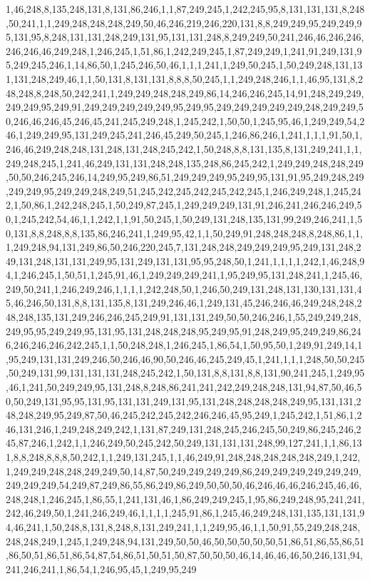 1,46,248,8,135,248,131,8,131,86,246,1,1,87,249,245,1,242,245,95,8,131,131,131,8,248,50,241,1,1,249,248,248,248,249,50,46,246,219,246,220,131,8,8,249,249,95,249,249,95,131,95,8,248,131,131,248,249,131,95,131,131,248,8,249,249,50,241,246,46,246,246,246,246,46,249,248,1,246,245,1,51,86,1,242,249,245,1,87,249,249,1,241,91,249,131,95,249,245,246,1,14,86,50,1,245,246,50,46,1,1,1,241,1,249,50,245,1,50,249,248,131,131,131,248,249,46,1,1,50,131,8,131,131,8,8,8,50,245,1,1,249,248,246,1,1,46,95,131,8,248,248,8,248,50,242,241,1,249,249,248,248,249,86,14,246,246,245,14,91,248,249,249,249,249,95,249,91,249,249,249,249,249,95,249,95,249,249,249,249,249,248,249,249,50,246,46,246,45,246,45,241,245,249,248,1,245,242,1,50,50,1,245,95,46,1,249,249,54,246,1,249,249,95,131,249,245,241,246,45,249,50,245,1,246,86,246,1,241,1,1,1,91,50,1,246,46,249,248,248,131,248,131,248,245,242,1,50,248,8,8,131,135,8,131,249,241,1,1,249,248,245,1,241,46,249,131,131,248,248,135,248,86,245,242,1,249,249,248,248,249,50,50,246,245,246,14,249,95,249,86,51,249,249,249,95,249,95,131,91,95,249,248,249,249,249,95,249,249,248,249,51,245,242,245,242,245,242,245,1,246,249,248,1,245,242,1,50,86,1,242,248,245,1,50,249,87,245,1,249,249,249,131,91,246,241,246,246,249,50,1,245,242,54,46,1,1,242,1,1,91,50,245,1,50,249,131,248,135,131,99,249,246,241,1,50,131,8,8,248,8,8,135,86,246,241,1,249,95,42,1,1,50,249,91,248,248,248,8,248,86,1,1,1,249,248,94,131,249,86,50,246,220,245,7,131,248,248,249,249,249,95,249,131,248,249,131,248,131,131,249,95,131,249,131,131,95,95,248,50,1,241,1,1,1,1,242,1,46,248,94,1,246,245,1,50,51,1,245,91,46,1,249,249,249,241,1,95,249,95,131,248,241,1,245,46,249,50,241,1,246,249,246,1,1,1,1,242,248,50,1,246,50,249,131,248,131,130,131,131,45,46,246,50,131,8,8,131,135,8,131,249,246,46,1,249,131,45,246,246,46,249,248,248,248,248,135,131,249,246,246,245,249,91,131,131,249,50,50,246,246,1,55,249,249,248,249,95,95,249,249,95,131,95,131,248,248,248,95,249,95,91,248,249,95,249,249,86,246,246,246,246,242,245,1,1,50,248,248,1,246,245,1,86,54,1,50,95,50,1,249,91,249,14,1,95,249,131,131,249,246,50,246,46,90,50,246,46,245,249,45,1,241,1,1,1,248,50,50,245,50,249,131,99,131,131,131,248,245,242,1,50,131,8,8,131,8,8,131,90,241,245,1,249,95,46,1,241,50,249,249,95,131,248,8,248,86,241,241,242,249,248,248,131,94,87,50,46,50,50,249,131,95,95,131,95,131,131,249,131,95,131,248,248,248,248,249,95,131,131,248,248,249,95,249,87,50,46,245,242,245,242,246,246,45,95,249,1,245,242,1,51,86,1,246,131,246,1,249,248,249,242,1,131,87,249,131,248,245,246,245,50,249,86,245,246,245,87,246,1,242,1,1,246,249,50,245,242,50,249,131,131,131,248,99,127,241,1,1,86,131,8,8,248,8,8,8,50,242,1,1,249,131,245,1,1,46,249,91,248,248,248,248,248,249,1,242,1,249,249,248,248,249,249,50,14,87,50,249,249,249,249,86,249,249,249,249,249,249,249,249,249,54,249,87,249,86,55,86,249,86,249,50,50,50,46,246,46,46,246,245,46,46,248,248,1,246,245,1,86,55,1,241,131,46,1,86,249,249,245,1,95,86,249,248,95,241,241,242,46,249,50,1,241,246,249,46,1,1,1,1,245,91,86,1,245,46,249,248,131,135,131,131,94,46,241,1,50,248,8,131,8,248,8,131,249,241,1,1,249,95,46,1,1,50,91,55,249,248,248,248,248,249,1,245,1,249,248,94,131,249,50,50,46,50,50,50,50,50,51,86,51,86,55,86,51,86,50,51,86,51,86,54,87,54,86,51,50,51,50,87,50,50,50,46,14,46,46,46,50,246,131,94,241,246,241,1,86,54,1,246,95,45,1,249,95,249